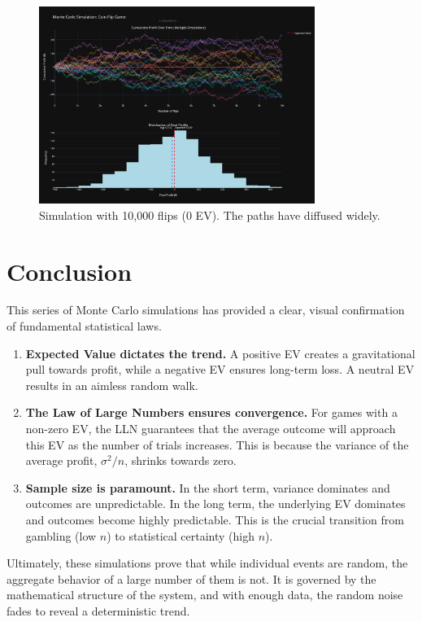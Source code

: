 \documentclass[12pt]{article}
\begin{document}
\begin{figure}[h!]
\centering
\includegraphics[width=0.8\textwidth]{nev/10knev.png}
\caption{Simulation with 10,000 flips (0 EV). The paths have diffused widely.}
\end{figure}
\clearpage

\section{Conclusion}
This series of Monte Carlo simulations has provided a clear, visual confirmation of fundamental statistical laws.

\begin{enumerate}
    \item \textbf{Expected Value dictates the trend.} A positive EV creates a gravitational pull towards profit, while a negative EV ensures long-term loss. A neutral EV results in an aimless random walk.
    \item \textbf{The Law of Large Numbers ensures convergence.} For games with a non-zero EV, the LLN guarantees that the average outcome will approach this EV as the number of trials increases. This is because the variance of the average profit, $\sigma^2/n$, shrinks towards zero.
    \item \textbf{Sample size is paramount.} In the short term, variance dominates and outcomes are unpredictable. In the long term, the underlying EV dominates and outcomes become highly predictable. This is the crucial transition from gambling (low $n$) to statistical certainty (high $n$).
\end{enumerate}

Ultimately, these simulations prove that while individual events are random, the aggregate behavior of a large number of them is not. It is governed by the mathematical structure of the system, and with enough data, the random noise fades to reveal a deterministic trend.
\end{document}
